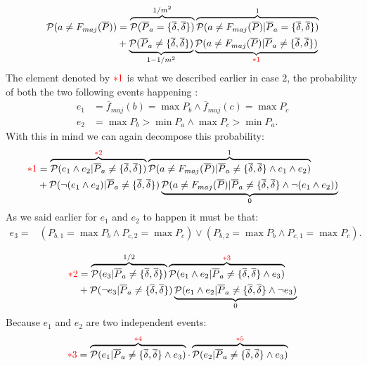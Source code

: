 \documentclass[version=3.21, pagesize, twoside=off, bibliography=totoc, DIV=calc, fontsize=12pt, a4paper]{scrartcl}
\begin{document}
\begin{align}
	\mathcal{P}(a\neq F_{maj}(\overline{P})) &=\overbrace{\mathcal{P}(\overline{P}_a=\{\overline{\delta},\overline{\delta}\})}^{1/m^2} \overbrace{\mathcal{P}(a\neq F_{maj}(\overline{P})|\overline{P}_a=\{\overline{\delta},\overline{\delta}\})}^{1}\\
	&+\underbrace{\mathcal{P}(\overline{P}_a\neq\{\overline{\delta},\overline{\delta}\})}_{1-1/m^2} \underbrace{\mathcal{P}(a\neq F_{maj}(\overline{P})|\overline{P}_a\neq\{\overline{\delta},\overline{\delta}\})}_{\color{red}*1}
\end{align}
The element denoted by ${\color{red}*1}$ is what we described earlier in case $2$, the probability of both the two following events happening :
\begin{align}
	e_1 &= \overline{f}_{maj}(b)=\max{P_{b}} \wedge \overline{f}_{maj}(c)=\max{P_{c}}\\
	e_2 &= \max{P_{b}}>\min{P_{a}} \wedge \max{P_{c}}>\min{P_{a}}.
\end{align}	
With this in mind we can again decompose this probability:
\begin{align}
	{\color{red}*1} &=\overbrace{\mathcal{P}(e_1 \wedge e_2 |\overline{P}_a\neq\{\overline{\delta},\overline{\delta}\}) }^{{\color{red}*2}} \overbrace{\mathcal{P}(a\neq F_{maj}(\overline{P})|\overline{P}_a\neq\{\overline{\delta},\overline{\delta}\}\wedge e_1 \wedge e_2)}^{1}\\
	&+\mathcal{P}(\lnot(e_1 \wedge e_2) |\overline{P}_a\neq\{\overline{\delta},\overline{\delta}\}) \underbrace{\mathcal{P}(a\neq F_{maj}(\overline{P})|\overline{P}_a\neq\{\overline{\delta},\overline{\delta}\}\wedge \lnot (e_1 \wedge e_2))}_{0}
\end{align}
As we said earlier for $e_1$ and $e_2$ to happen  it must be that:
\begin{align}
	e_3 = &(P_{b,1} = \max{P_{b}} \wedge P_{c,2} = \max{P_{c}}) \vee (P_{b,2} = \max{P_{b}} \wedge P_{c,1} = \max{P_{c}}) .
\end{align}

\begin{align}
	{\color{red}*2} &=\overbrace{\mathcal{P}(e_3 |\overline{P}_a\neq\{\overline{\delta},\overline{\delta}\}) }^{1/2} \overbrace{\mathcal{P}(e_1 \wedge e_2|\overline{P}_a\neq\{\overline{\delta},\overline{\delta}\}\wedge e_3)}^{{\color{red}*3}}\\
	&+\mathcal{P}(\lnot e_3 |\overline{P}_a\neq\{\overline{\delta},\overline{\delta}\}) \underbrace{\mathcal{P}(e_1 \wedge e_2|\overline{P}_a\neq\{\overline{\delta},\overline{\delta}\}\wedge \lnot e_3)}_{0}
\end{align}
Because $e_1$ and $e_2$ are two independent events:
\begin{align}
	{\color{red}*3} &=\overbrace{\mathcal{P}(e_1 |\overline{P}_a\neq\{\overline{\delta},\overline{\delta}\}\wedge e_3)}^{{\color{red}*4}} \cdot \overbrace{\mathcal{P}(e_2 |\overline{P}_a\neq\{\overline{\delta},\overline{\delta}\}\wedge e_3)}^{{\color{red}*5}}
\end{align}
\end{document}
